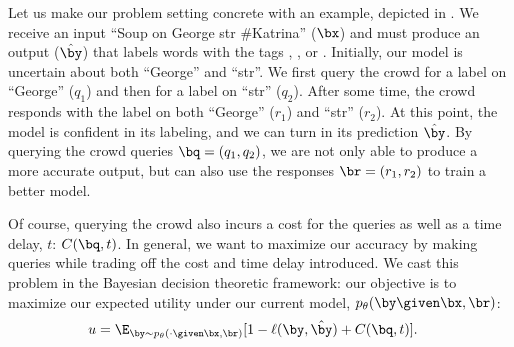 Let us make our problem setting concrete with an example, depicted in .
We receive an input ``Soup on George str \#Katrina'' ($\bx$) and must produce an output ($\byt$) that labels words with the tags \scper{}, \scloc{}, \scres{} or \scnone{}.
Initially, our model is uncertain about both ``George'' and ``str''.
We first query the crowd for a label on ``George'' ($q_1$) and then for a label on ``str'' ($q_2$). 
After some time, the crowd responds with the label \scloc{} on both ``George'' ($r_1$) and ``str'' ($r_2$).
At this point, the model is confident in its labeling, and we can turn in its prediction $\byt$.
By querying the crowd queries $\bq = (q_1, q_2)$, we are not only able to produce a more accurate output, but can also use the responses $\br = (r_1, r_2)$ to train a better model.

Of course, querying the crowd also incurs a cost for the queries as well as a time delay, $t$: $C(\bq, t)$.
In general, we want to maximize our accuracy by making queries while trading off the cost and time delay introduced.
We cast this problem in the Bayesian decision theoretic framework: our objective is to maximize our expected utility under our current model,
$\p(\by \given \bx, \br)$:
\begin{align*}
  u &= \E_{\by \sim \p(\cdot \given \bx, \br)}[1 - \ell(\by, \byt) + C(\bq, t)].
\end{align*}

%
%
%
